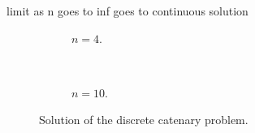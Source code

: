 \documentclass[11pt,a4paper,twocolumn]{article}
\begin{document}
limit as n goes to inf goes to continuous solution





\begin{figure*}[tbp]
	\centering
	\begin{subfigure}{\textwidth}
		\centering
		
		\caption{$n = 4$.}
		\label{fig:beam5}
	\end{subfigure} \\
	\begin{subfigure}{\textwidth}
		\centering
		
		\caption{$n = 10$.}
		\label{fig:beam11}	
	\end{subfigure}
	\caption{Solution of the discrete catenary problem.}
	\label{fig:catenary}
\end{figure*}


\begin{figure}[tbp]
	\centering
	
	\caption{}
	\label{fig:convergence}
\end{figure}

%
\end{document}
